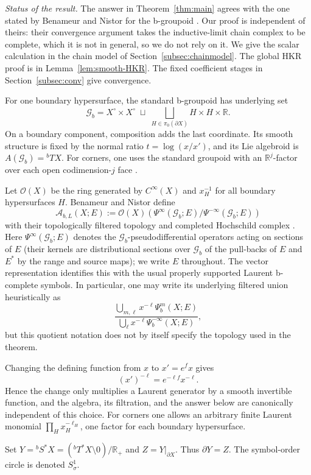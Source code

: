 \documentclass[11pt,oneside,reqno]{article}
\newcommand{\cA}{\mathcal A}
\newcommand{\cO}{\mathcal O}
\newcommand{\Sbstar}{{}^{b}S^*X}
\newcommand{\Tbstar}{{}^{b}T^*X}
\newcommand{\Gb}{\mathcal G_b}
\theoremstyle{plain}
\theoremstyle{definition}
\theoremstyle{remark}
\begin{document}
\emph{Status of the result.} The answer in Theorem~\ref{thm:main} agrees
with the one stated by Benameur and Nistor for the b-groupoid
\cite{BNsymbols,BNfamilies}. Our proof is independent of theirs: their
convergence argument takes the inductive-limit chain complex to be
complete, which it is not in general, so we do not rely on it. We give the
scalar calculation
in the chain model of Section~\ref{subsec:chainmodel}. The
global HKR proof is in Lemma~\ref{lem:smooth-HKR}. The fixed coefficient
stages in Section~\ref{subsec:conv} give convergence.

For one boundary hypersurface, the standard b-groupoid has underlying set
\[
 \Gb=X^\circ\times X^\circ
 \;\sqcup\;
 \bigsqcup_{H\in\pi_0(\partial X)}H\times H\times\mathbb R.
\]
On a boundary component, composition adds the last coordinate. Its smooth
structure is fixed by the normal ratio
\(t=\log(x/x')\), and its Lie algebroid is
\(A(\Gb)={}^bTX\). For corners, one uses the standard groupoid with an
\(\mathbb R^j\)-factor over each open codimension-\(j\) face
\cite{BNfamilies}.

Let \(\cO(X)\) be the ring generated by \(C^\infty(X)\) and
\(x_H^{-1}\) for all boundary hypersurfaces \(H\). Benameur and Nistor
define
\[
 \cA_{b,L}(X;E)
 :=\cO(X)\left(
 \Psi^\infty(\Gb;E)/\Psi^{-\infty}(\Gb;E)
 \right)
\]
with their topologically filtered topology and completed Hochschild
complex \cite{BNsymbols,BNfamilies}. Here \(\Psi^\infty(\Gb;E)\) denotes
the \(\Gb\)-pseudodifferential operators acting on sections of \(E\) (their
kernels are distributional sections over \(\Gb\) of the pull-backs of
\(E\) and \(E^*\) by the range and source maps); we write \(E\) throughout. The vector representation identifies
this with the usual properly supported Laurent b-complete symbols. In
particular, one may write its underlying filtered union heuristically as
\[
 \frac{\bigcup_{m,\ell}x^{-\ell}\Psi_b^m(X;E)}
      {\bigcup_\ell x^{-\ell}\Psi_b^{-\infty}(X;E)},
\]
but this quotient notation does not by itself specify the topology used in
the theorem.

Changing the defining function from \(x\) to \(x'=e^f x\) gives
\[
 (x')^{-\ell}=e^{-\ell f}x^{-\ell}.
\]
Hence the change only multiplies a Laurent generator by a smooth
invertible function, and the
algebra, its filtration, and the answer below are canonically independent of
this choice. For corners one allows an arbitrary finite Laurent monomial
\(\prod_Hx_H^{-\ell_H}\), one factor for each boundary hypersurface.

Set \(Y=\Sbstar=(\Tbstar\setminus0)/\mathbb R_+\) and
\(Z=Y|_{\partial X}\). Thus \(\partial Y=Z\). The symbol-order circle is
denoted \(S^1_\sigma\).
\end{document}
